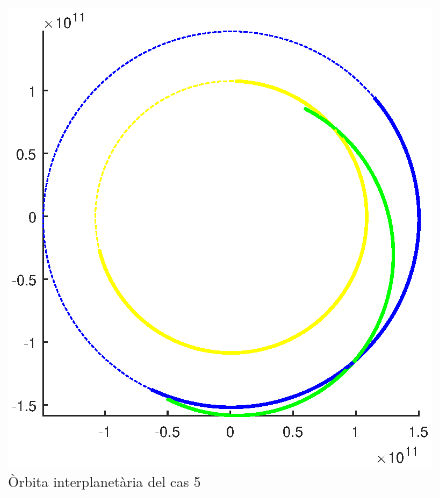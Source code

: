 \begin{figure}[H]
	\centering
	\includegraphics[scale=0.8]{./plots/cas5}
	\caption{Òrbita interplanetària del cas 5}
\end{figure}

